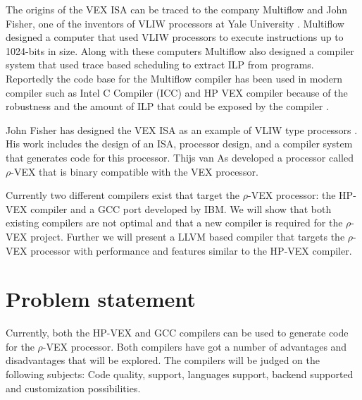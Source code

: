 The origins of the VEX ISA can be traced to the company Multiflow and John Fisher, one of the inventors of VLIW processors at Yale University \cite{Fisher:1983:VLI:1067651.801649}. Multiflow designed a computer that used VLIW processors to execute instructions up to 1024-bits in size. Along with these computers Multiflow also designed a compiler system that used trace based scheduling to extract ILP from programs. Reportedly the code base for the Multiflow compiler has been used in modern compiler such as Intel C Compiler (ICC) and HP VEX compiler because of the robustness and the amount of ILP that could be exposed by the compiler \cite{Lowney:1993qy}.

John Fisher has designed the VEX ISA as an example of VLIW type processors \cite{Joseph-A.-Fisher:2005cr}. His work includes the design of an ISA, processor design, and a compiler system that generates code for this processor. Thijs van As developed a processor called $\rho$-VEX that is binary compatible with the VEX processor.

Currently two different compilers exist that target the $\rho$-VEX processor: the HP-VEX compiler and a GCC port developed by IBM. We will show that both existing compilers are not optimal and that a new compiler is required for the $\rho$-VEX project. Further we will present a LLVM based compiler that targets the $\rho$-VEX processor with performance and features similar to the HP-VEX compiler. 

\section{Problem statement}
Currently, both the HP-VEX and GCC compilers can be used to generate code for the $\rho$-VEX processor. Both compilers have got a number of advantages and disadvantages that will be explored. The compilers will be judged on the following subjects: Code quality, support, languages support, backend supported and customization possibilities.
\newline

